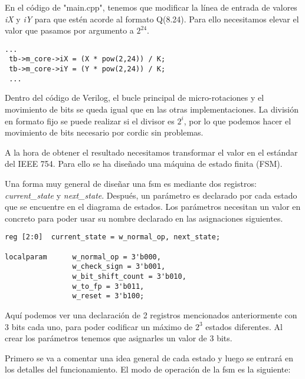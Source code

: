 En el código de "main.cpp", tenemos que modificar la línea de entrada de valores \textit{iX} y \textit{iY} para que estén acorde al formato Q(8.24). Para ello necesitamos elevar el valor que pasamos por argumento a $2^{24}$.

\begin{lstlisting}[caption={Cambios de entrada de valores de C++ a Verilog en la implementación de Punto Flotante}]
 ...
 tb->m_core->iX = (X * pow(2,24)) / K;  
 tb->m_core->iY = (Y * pow(2,24)) / K;
 ...
\end{lstlisting}

Dentro del código de Verilog, el bucle principal de micro-rotaciones y el movimiento de bits se queda igual que en las otras implementaciones. La división en formato fijo se puede realizar si el divisor es $2^i$, por lo que podemos hacer el movimiento de bits necesario por \gls{cordic} sin problemas.

A la hora de obtener el resultado necesitamos transformar el valor en el estándar del IEEE 754. Para ello se ha diseñado una máquina de estado finita (FSM).

Una forma muy general de diseñar una \gls{fsm} es mediante dos registros: \textit{current\_state} y \textit{next\_state}. Después, un parámetro es declarado por cada estado que se encuentre en el diagrama de estados. Los parámetros necesitan un valor en concreto para poder usar su nombre declarado en las asignaciones siguientes.

\begin{lstlisting}[caption={Registros para controlar los estádos y parámetros locales de estado para controlar la máquina de estado finita.}]
reg [2:0]  current_state = w_normal_op, next_state;

localparam      w_normal_op = 3'b000,
                w_check_sign = 3'b001,
                w_bit_shift_count = 3'b010,
                w_to_fp = 3'b011,
                w_reset = 3'b100;

\end{lstlisting}

Aquí podemos ver una declaración de 2 registros mencionados anteriormente con 3 bits cada uno, para poder codificar un máximo de $2^3$ estados diferentes. Al crear los parámetros tenemos que asignarles un valor de 3 bits.

Primero se va a comentar una idea general de cada estado y luego se entrará en los detalles del funcionamiento. El modo de operación de la \gls{fsm} es la siguiente:

